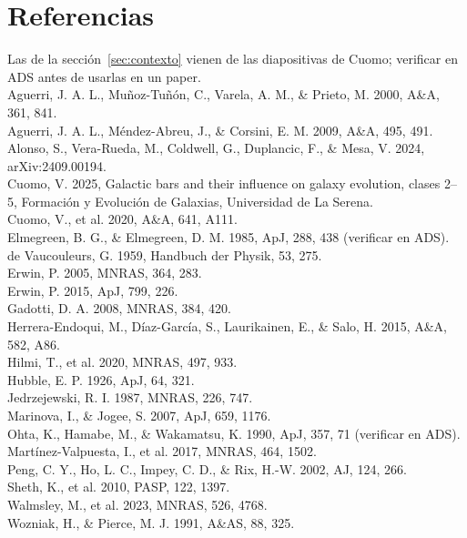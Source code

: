 \documentclass[11pt,a4paper]{article}
\begin{document}
\section*{Referencias}
\small
Las de la sección~\ref{sec:contexto} vienen de las diapositivas de Cuomo; verificar en ADS antes de usarlas en un paper.\\[2pt]
Aguerri, J. A. L., Muñoz-Tuñón, C., Varela, A. M., \& Prieto, M. 2000, A\&A, 361, 841.\\
Aguerri, J. A. L., Méndez-Abreu, J., \& Corsini, E. M. 2009, A\&A, 495, 491.\\
Alonso, S., Vera-Rueda, M., Coldwell, G., Duplancic, F., \& Mesa, V. 2024, arXiv:2409.00194.\\
Cuomo, V. 2025, Galactic bars and their influence on galaxy evolution, clases 2--5, Formación y Evolución de
Galaxias, Universidad de La Serena.\\
Cuomo, V., et al. 2020, A\&A, 641, A111.\\
Elmegreen, B. G., \& Elmegreen, D. M. 1985, ApJ, 288, 438 (verificar en ADS).\\
de Vaucouleurs, G. 1959, Handbuch der Physik, 53, 275.\\
Erwin, P. 2005, MNRAS, 364, 283.\\
Erwin, P. 2015, ApJ, 799, 226.\\
Gadotti, D. A. 2008, MNRAS, 384, 420.\\
Herrera-Endoqui, M., Díaz-García, S., Laurikainen, E., \& Salo, H. 2015, A\&A, 582, A86.\\
Hilmi, T., et al. 2020, MNRAS, 497, 933.\\
Hubble, E. P. 1926, ApJ, 64, 321.\\
Jedrzejewski, R. I. 1987, MNRAS, 226, 747.\\
Marinova, I., \& Jogee, S. 2007, ApJ, 659, 1176.\\
Ohta, K., Hamabe, M., \& Wakamatsu, K. 1990, ApJ, 357, 71 (verificar en ADS).\\
Martínez-Valpuesta, I., et al. 2017, MNRAS, 464, 1502.\\
Peng, C. Y., Ho, L. C., Impey, C. D., \& Rix, H.-W. 2002, AJ, 124, 266.\\
Sheth, K., et al. 2010, PASP, 122, 1397.\\
Walmsley, M., et al. 2023, MNRAS, 526, 4768.\\
Wozniak, H., \& Pierce, M. J. 1991, A\&AS, 88, 325.
\end{document}

